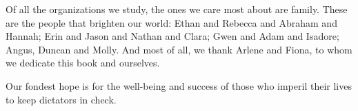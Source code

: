 \documentclass[10pt]{article}
\begin{document}
{\large Of all the organizations we study, the ones we care most about are
family. These are the people that brighten our world: Ethan and Rebecca and
Abraham and Hannah; Erin and Jason and Nathan and Clara; Gwen and Adam and
Isadore; Angus, Duncan and Molly. And most of all, we thank Arlene and Fiona, to
whom we dedicate this book and ourselves.}

{\large Our fondest hope is for the well-being and success of those who imperil
their lives to keep dictators in check.}
\end{document}

